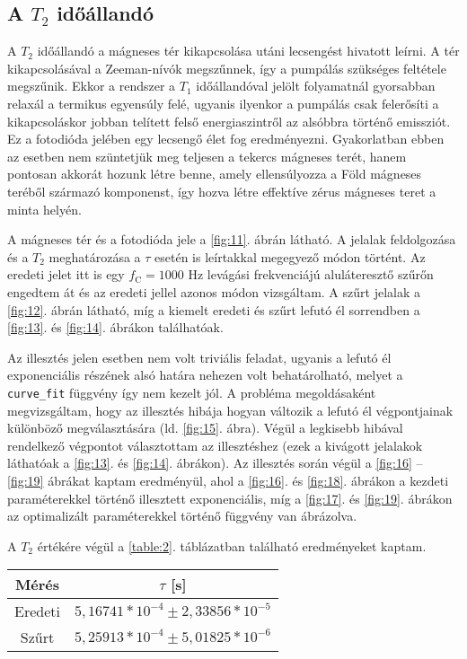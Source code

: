 \begin{multicols}{2}
\subsection{A $T_{2}$ időállandó}
A $T_{2}$ időállandó a mágneses tér kikapcsolása utáni lecsengést hivatott leírni. A tér kikapcsolásával a Zeeman-nívók megszűnnek, így a pumpálás szükséges feltétele megszűnik. Ekkor a rendszer a $T_{1}$ időállandóval jelölt folyamatnál gyorsabban relaxál a termikus egyensúly felé, ugyanis ilyenkor a pumpálás csak felerősíti a kikapcsoláskor jobban telített felső energiaszintről az alsóbbra történő emissziót. Ez a fotodióda jelében egy lecsengő élet fog eredményezni. Gyakorlatban ebben az esetben nem szüntetjük meg teljesen a tekercs mágneses terét, hanem pontosan akkorát hozunk létre benne, amely ellensúlyozza a Föld mágneses teréből származó komponenst, így hozva létre effektíve zérus mágneses teret a minta helyén. \par
A mágneses tér és a fotodióda jele a \ref{fig:11}. ábrán látható. A jelalak feldolgozása és a $T_{2}$ meghatározása a $\tau$ esetén is leírtakkal megegyező módon történt. Az eredeti jelet itt is egy $f_{\text{C}} = 1000$ Hz levágási frekvenciájú aluláteresztő szűrőn engedtem át és az eredeti jellel azonos módon vizsgáltam. A szűrt jelalak a \ref{fig:12}. ábrán látható, míg a kiemelt eredeti és szűrt lefutó él sorrendben a \ref{fig:13}. és \ref{fig:14}. ábrákon találhatóak. \par
Az illesztés jelen esetben nem volt triviális feladat, ugyanis a lefutó él exponenciális részének alsó határa nehezen volt behatárolható, melyet a \texttt{curve\_fit} függvény így nem kezelt jól. A probléma megoldásaként megvizsgáltam, hogy az illesztés hibája hogyan változik a lefutó él végpontjainak különböző megválasztására (ld. \ref{fig:15}. ábra). Végül a legkisebb hibával rendelkező végpontot választottam az illesztéshez (ezek a kivágott jelalakok láthatóak a \ref{fig:13}. és \ref{fig:14}. ábrákon). Az illesztés során végül a \ref{fig:16} -- \ref{fig:19} ábrákat kaptam eredményül, ahol a \ref{fig:16}. és \ref{fig:18}. ábrákon a kezdeti paraméterekkel történő illesztett exponenciális, míg a \ref{fig:17}. és \ref{fig:19}. ábrákon az optimalizált paraméterekkel történő függvény van ábrázolva. \par
A $T_{2}$ értékére végül a \ref{table:2}. táblázatban található eredményeket kaptam.

\begin{center}
\begin{tabular}{|c|c|}
\hline
Mérés            & $\tau$ [s]                                \\ \hline \hline
Eredeti          & $5,16741 * 10^{-4} \pm 2,33856 * 10^{-5}$ \\ \hline
Szűrt            & $5,25913 * 10^{-4} \pm 5,01825 * 10^{-6}$ \\ \hline
\end{tabular}
 \label{table:2}
\end{center}


\end{multicols}
